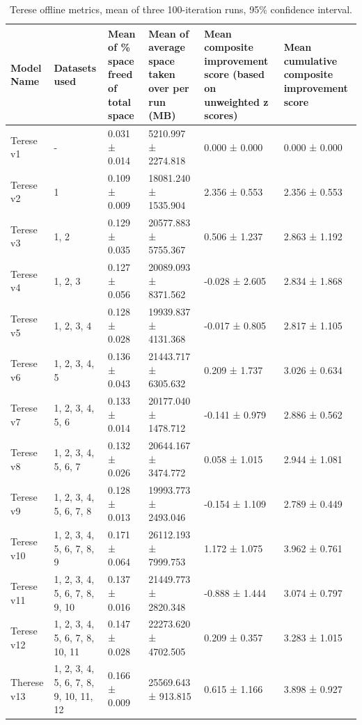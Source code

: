 \documentclass{article}
\begin{document}
\begin{table}[H]
\centering
\setlength{\tabcolsep}{3pt}
\renewcommand{\arraystretch}{1.3}
\footnotesize
\begin{tabularx}{\textwidth}{|L|L|L|L|L|L|}
    \hline
    \textbf{Model Name} & 
    \textbf{Datasets used} & 
    \textbf{Mean of \% space freed of total space} & 
    \textbf{Mean of average space taken over per run (MB)} & 
    \textbf{Mean composite improvement score (based on unweighted z scores)} & 
    \textbf{Mean cumulative composite improvement score} \\ 
    \hline
    Terese v1 & - & 0.031 ± 0.014 & 5210.997 ± 2274.818 & 0.000 ± 0.000 & 0.000 ± 0.000 \\ 
    \hline
    Terese v2 & 1 & 0.109 ± 0.009 & 18081.240 ± 1535.904 & 2.356 ± 0.553 & 2.356 ± 0.553 \\ 
    \hline
    Terese v3 & 1, 2 & 0.129 ± 0.035 & 20577.883 ± 5755.367 & 0.506 ± 1.237 & 2.863 ± 1.192 \\ 
    \hline
    Terese v4 & 1, 2, 3 & 0.127 ± 0.056 & 20089.093 ± 8371.562 & -0.028 ± 2.605 & 2.834 ± 1.868 \\ 
    \hline
    Terese v5 & 1, 2, 3, 4 & 0.128 ± 0.028 & 19939.837 ± 4131.368 & -0.017 ± 0.805 & 2.817 ± 1.105 \\ 
    \hline
    Terese v6 & 1, 2, 3, 4, 5 & 0.136 ± 0.043 & 21443.717 ± 6305.632 & 0.209 ± 1.737 & 3.026 ± 0.634 \\ 
    \hline
    Terese v7 & 1, 2, 3, 4, 5, 6 & 0.133 ± 0.014 & 20177.040 ± 1478.712 & -0.141 ± 0.979 & 2.886 ± 0.562 \\
    \hline
    Terese v8 & 1, 2, 3, 4, 5, 6, 7 & 0.132 ± 0.026 & 20644.167 ± 3474.772 & 0.058 ± 1.015 & 2.944 ± 1.081 \\
    \hline
    Terese v9 & 1, 2, 3, 4, 5, 6, 7, 8 & 0.128 ± 0.013 & 19993.773 ± 2493.046 & -0.154 ± 1.109 & 2.789 ± 0.449 \\
    \hline
    Terese v10 & 1, 2, 3, 4, 5, 6, 7, 8, 9 & 0.171 ± 0.064 & 26112.193 ± 7999.753 & 1.172 ± 1.075 & 3.962 ± 0.761 \\
    \hline
    Terese v11 & 1, 2, 3, 4, 5, 6, 7, 8, 9, 10 & 0.137 ± 0.016 & 21449.773 ± 2820.348 & -0.888 ± 1.444 & 3.074 ± 0.797 \\
    \hline
    Terese v12 & 1, 2, 3, 4, 5, 6, 7, 8, 10, 11 & 0.147 ± 0.028 & 22273.620 ± 4702.505 & 0.209 ± 0.357 & 3.283 ± 1.015 \\
    \hline
    Therese v13 & 1, 2, 3, 4, 5, 6, 7, 8, 9, 10, 11, 12 & 0.166 ± 0.009 & 25569.643 ± 913.815 & 0.615 ± 1.166 & 3.898 ± 0.927 \\
    \hline
\end{tabularx}
\caption{Terese offline metrics, mean of three 100-iteration runs, 95\% confidence interval.}
\label{tab:terese_offline_metrics}
\end{table}
\end{document}
